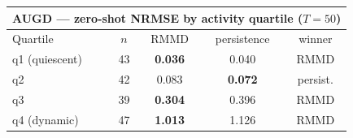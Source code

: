 \begin{tabular}{lcccc}
\toprule
\multicolumn{5}{c}{AUGD --- zero-shot NRMSE by activity quartile ($T{=}50$)} \\
\midrule
Quartile & $n$ & RMMD & persistence & winner \\
\midrule
q1 (quiescent) & 43 & \textbf{0.036} & 0.040 & RMMD \\
q2 & 42 & 0.083 & \textbf{0.072} & persist. \\
q3 & 39 & \textbf{0.304} & 0.396 & RMMD \\
q4 (dynamic) & 47 & \textbf{1.013} & 1.126 & RMMD \\
\bottomrule
\end{tabular}
